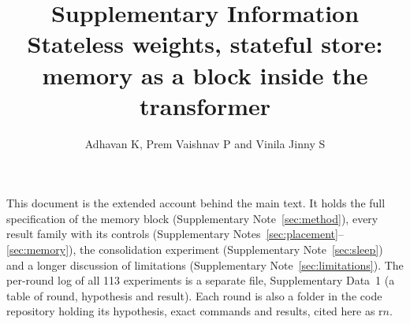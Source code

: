 \documentclass[11pt]{article}
\title{\textbf{Supplementary Information}\\[4pt]
\large Stateless weights, stateful store: memory as a block inside the transformer}
\author{Adhavan K, Prem Vaishnav P and Vinila Jinny S}
\date{}
\begin{document}
\maketitle

\noindent This document is the extended account behind the main text. It holds the
full specification of the memory block (Supplementary Note~\ref{sec:method}), every result
family with its controls (Supplementary Notes~\ref{sec:placement}--\ref{sec:memory}), the
consolidation experiment (Supplementary Note~\ref{sec:sleep}) and a longer discussion of
limitations (Supplementary Note~\ref{sec:limitations}). The per-round log of all 113
experiments is a separate file, Supplementary Data~1 (a table of round, hypothesis and
result). Each round is also a folder in the code repository holding its hypothesis, exact
commands and results, cited here as r$n$.










\end{document}
